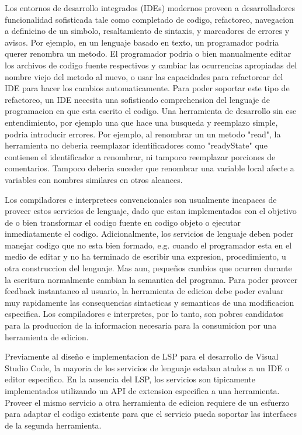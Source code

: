 \documentclass[12pt, a4paper]{report}
\begin{document}
    Los entornos de desarrollo integrados (IDEs) modernos proveen a desarrolladores funcionalidad sofisticada tale como completado de codigo, refactoreo, navegacion a definicino de un simbolo, resaltamiento de sintaxis, y marcadores de errores y avisos.
    Por ejemplo, en un lenguaje basado en texto, un programador podria querer renombra un metodo.
    El programador podria o bien manualmente editar los archivos de codigo fuente respectivos y cambiar las ocurrencias apropiadas del nombre viejo del metodo al nuevo, o usar las capacidades para refactorear del IDE para hacer los cambios automaticamente.
    Para poder soportar este tipo de refactoreo, un IDE necesita una sofisticado comprehension del lenguaje de programacion en que esta escrito el codigo.
    Una herramienta de desarrollo sin ese entendimiento, por ejemplo una que hace una busqueda y reemplazo simple, podria introducir errores.
    Por ejemplo, al renombrar un un metodo "read", la herramienta no deberia reemplazar identificadores como "readyState" que contienen el identificador a renombrar, ni tampoco reemplazar porciones de comentarios. Tampoco deberia suceder que renombrar una variable local afecte a variables con nombres similares en otros alcances.
    \cite{language_server_protocol_wiki}

    Los compiladores e interpretees convencionales son usualmente incapaces de proveer estos servicios de lenguaje, dado que estan implementados con el objetivo de o bien transformar el codigo fuente en codigo objeto o ejecutar inmediatamente el codigo.
    Adicionalmente, los servicios de lenguaje deben poder manejar codigo que no esta bien formado, e.g. cuando el programador esta en el medio de editar y no ha terminado de escribir una expresion, procedimiento, u otra construccion del lenguaje.
    Mas aun, pequeños cambios que ocurren durante la escritura normalmente cambian la semantica del programa.
    Para poder proveer feedback instantaneo al usuario, la herramienta de edicion debe poder evaluar muy rapidamente las consequencias sintacticas y semanticas de una modificacion especifica.
    Los compiladores e interpretes, por lo tanto, son pobres candidatos para la produccion de la informacion necesaria para la consumicion por una herramienta de edicion.
    \cite{language_server_protocol_wiki}

    Previamente al diseño e implementacion de LSP para el desarrollo de Visual Studio Code, la mayoria de los servicios de lenguaje estaban atados a un IDE o editor especifico.
    En la ausencia del LSP, los servicios son tipicamente implementados utilizando un API de extension especifica a una herramienta.
    Proveer el mismo servicio a otra herramienta de edicion requiere de un esfuerzo para adaptar el codigo existente para que el servicio pueda soportar las interfaces de la segunda herramienta.
    \cite{language_server_protocol_wiki}
\end{document}
